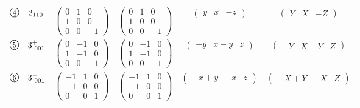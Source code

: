 \documentclass[fleqn,10pt,landscape]{jsarticle}
\begin{document}
\begin{center}
\begin{longtable}{lcccc}
$ {\ooalign{\hfil\resizebox{.8\width}{\height}{4}\hfil\crcr\raise.1ex\hbox{\large$\bigcirc$}}}\quad 2{}_{110} $ & $ \begin{pmatrix} 0 & 1 & 0 \\ 1 & 0 & 0 \\ 0 & 0 & -1 \end{pmatrix} $ & $ \begin{pmatrix} 0 & 1 & 0 \\ 1 & 0 & 0 \\ 0 & 0 & -1 \end{pmatrix} $ & $ \begin{pmatrix} y & x & - z \end{pmatrix} $ & $ \begin{pmatrix} Y & X & - Z \end{pmatrix} $ \\
$ {\ooalign{\hfil\resizebox{.8\width}{\height}{5}\hfil\crcr\raise.1ex\hbox{\large$\bigcirc$}}}\quad 3^{+}_{\,\,001} $ & $ \begin{pmatrix} 0 & -1 & 0 \\ 1 & -1 & 0 \\ 0 & 0 & 1 \end{pmatrix} $ & $ \begin{pmatrix} 0 & -1 & 0 \\ 1 & -1 & 0 \\ 0 & 0 & 1 \end{pmatrix} $ & $ \begin{pmatrix} - y & x - y & z \end{pmatrix} $ & $ \begin{pmatrix} - Y & X - Y & Z \end{pmatrix} $ \\
$ {\ooalign{\hfil\resizebox{.8\width}{\height}{6}\hfil\crcr\raise.1ex\hbox{\large$\bigcirc$}}}\quad 3^{-}_{\,\,001} $ & $ \begin{pmatrix} -1 & 1 & 0 \\ -1 & 0 & 0 \\ 0 & 0 & 1 \end{pmatrix} $ & $ \begin{pmatrix} -1 & 1 & 0 \\ -1 & 0 & 0 \\ 0 & 0 & 1 \end{pmatrix} $ & $ \begin{pmatrix} - x + y & - x & z \end{pmatrix} $ & $ \begin{pmatrix} - X + Y & - X & Z \end{pmatrix} $ \\
\end{longtable}
\end{center}
\end{document}
